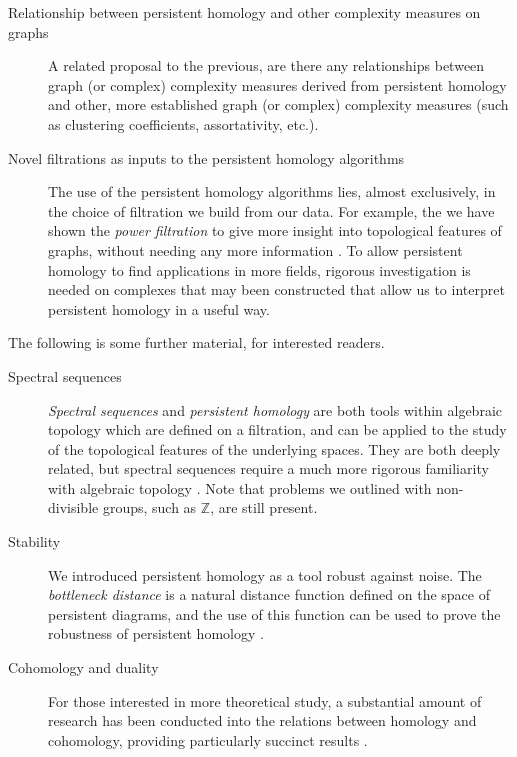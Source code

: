 \begin{description}
    \item[Relationship between persistent homology and other complexity measures on graphs] A related proposal to the previous, are there any relationships between graph (or complex) complexity measures derived from persistent homology and other, more established graph (or complex) complexity measures (such as clustering coefficients, assortativity, etc.).
    \item[Novel filtrations as inputs to the persistent homology algorithms] The use of the persistent homology algorithms lies, almost exclusively, in the choice of filtration we build from our data. For example, the we have shown the \emph{power filtration} to give more insight into topological features of graphs, without needing any more information \cite{benzekry2015design}. To allow persistent homology to find applications in more fields, rigorous investigation is needed on complexes that may been constructed that allow us to interpret persistent homology in a useful way. 
\end{description}

The following is some further material, for interested readers.

\begin{description}
    \item[Spectral sequences] \emph{Spectral sequences} and \emph{persistent homology} are both tools within algebraic topology which are defined on a filtration, and can be applied to the study of the topological features of the underlying spaces. They are both deeply related, but spectral sequences require a much more rigorous familiarity with algebraic topology \cite{romero2013spectral}. Note that problems we outlined with non-divisible groups, such as $\mathbb Z$, are still present. 
    \item[Stability] We introduced persistent homology as a tool robust against noise. The \emph{bottleneck distance} is a natural distance function defined on the space of persistent diagrams, and the use of this function can be used to prove the robustness of persistent homology \cite{cohen2007stability}.
    \item[Cohomology and duality] For those interested in more theoretical study, a substantial amount of research has been conducted into the relations between homology and cohomology, providing particularly succinct results \cite{maunder1996algebraic, Hatcher:478079}.
\end{description}
